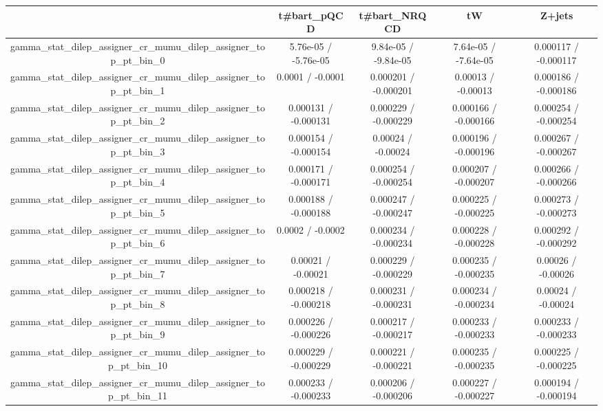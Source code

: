 \documentclass[10pt]{article}
\begin{document}
\begin{table}[htbp]
\begin{center}
\begin{tabular}{|c|c|c|c|c|}
\hline 
      & t#bar{t}_{pQCD}      & t#bar{t}_{NRQCD}      & tW      & Z+jets \\ 
\hline 
  gamma_stat_dilep_assigner_cr_mumu_dilep_assigner_top_pt_bin_0 & 5.76e-05 / -5.76e-05 & 9.84e-05 / -9.84e-05 & 7.64e-05 / -7.64e-05 & 0.000117 / -0.000117 \\ 
  gamma_stat_dilep_assigner_cr_mumu_dilep_assigner_top_pt_bin_1 & 0.0001 / -0.0001 & 0.000201 / -0.000201 & 0.00013 / -0.00013 & 0.000186 / -0.000186 \\ 
  gamma_stat_dilep_assigner_cr_mumu_dilep_assigner_top_pt_bin_2 & 0.000131 / -0.000131 & 0.000229 / -0.000229 & 0.000166 / -0.000166 & 0.000254 / -0.000254 \\ 
  gamma_stat_dilep_assigner_cr_mumu_dilep_assigner_top_pt_bin_3 & 0.000154 / -0.000154 & 0.00024 / -0.00024 & 0.000196 / -0.000196 & 0.000267 / -0.000267 \\ 
  gamma_stat_dilep_assigner_cr_mumu_dilep_assigner_top_pt_bin_4 & 0.000171 / -0.000171 & 0.000254 / -0.000254 & 0.000207 / -0.000207 & 0.000266 / -0.000266 \\ 
  gamma_stat_dilep_assigner_cr_mumu_dilep_assigner_top_pt_bin_5 & 0.000188 / -0.000188 & 0.000247 / -0.000247 & 0.000225 / -0.000225 & 0.000273 / -0.000273 \\ 
  gamma_stat_dilep_assigner_cr_mumu_dilep_assigner_top_pt_bin_6 & 0.0002 / -0.0002 & 0.000234 / -0.000234 & 0.000228 / -0.000228 & 0.000292 / -0.000292 \\ 
  gamma_stat_dilep_assigner_cr_mumu_dilep_assigner_top_pt_bin_7 & 0.00021 / -0.00021 & 0.000229 / -0.000229 & 0.000235 / -0.000235 & 0.00026 / -0.00026 \\ 
  gamma_stat_dilep_assigner_cr_mumu_dilep_assigner_top_pt_bin_8 & 0.000218 / -0.000218 & 0.000231 / -0.000231 & 0.000234 / -0.000234 & 0.00024 / -0.00024 \\ 
  gamma_stat_dilep_assigner_cr_mumu_dilep_assigner_top_pt_bin_9 & 0.000226 / -0.000226 & 0.000217 / -0.000217 & 0.000233 / -0.000233 & 0.000233 / -0.000233 \\ 
  gamma_stat_dilep_assigner_cr_mumu_dilep_assigner_top_pt_bin_10 & 0.000229 / -0.000229 & 0.000221 / -0.000221 & 0.000235 / -0.000235 & 0.000225 / -0.000225 \\ 
  gamma_stat_dilep_assigner_cr_mumu_dilep_assigner_top_pt_bin_11 & 0.000233 / -0.000233 & 0.000206 / -0.000206 & 0.000227 / -0.000227 & 0.000194 / -0.000194 \\ 

\end{tabular}
\end{center}
\end{table}
\end{document}
